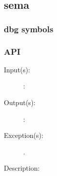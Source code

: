 %
%
%
%
%              

\label{sema}
\subsection{sema}

\subsubsection{dbg symbols}

\subsubsection{API}
\begin{description}
\label{sema_}
\item[{\cfunc[]{sema\_}{}}: ]
	\begin{description}\item[]
	\item[Input(s): ]
		\begin{description}\item[]
		\item[: ]
		\end{description}
	\item[Output(s): ]
		\begin{description}\item[]
		\item[: ]
		\end{description}
	\item[Exception(s): ]
		\begin{description}\item[]
		\item[.]
		\end{description}
	\item[Description: ]
	\end{description}
\end{description}
